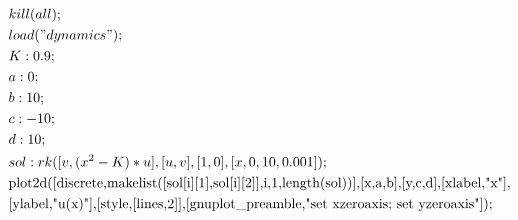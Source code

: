 \begin{align*}
& kill(all);\\
& load("dynamics");\\
& K:0.9;\\
& a:0;\\
& b:10;\\
& c:-10;\\
& d:10;\\
& sol:rk([v,(x^2-K)*u],[u,v],[1,0],[x,0,10,0.001]);\\
& \text{plot2d([discrete,makelist([sol[i][1],sol[i][2]],i,1,length(sol))],[x,a,b],[y,c,d],[xlabel,"x"],}\\
& \text{[ylabel,"u(x)"],[style,[lines,2]],[gnuplot\_preamble,"set xzeroaxis; set yzeroaxis"]);}
\end{align*}
